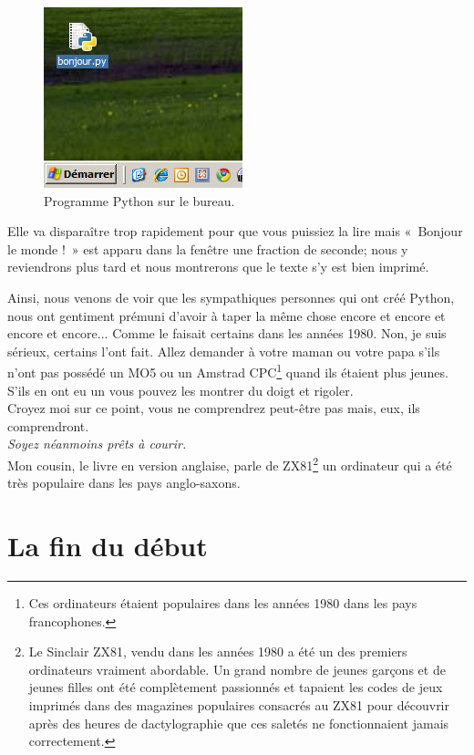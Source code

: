 \begin{figure}[!ht]
\centering
\includegraphics[scale=0.6]{images/bureau}
\caption{Programme Python sur le bureau.}\label{fig:bureau}
\end{figure}

Elle va disparaître trop rapidement pour que vous puissiez la lire mais « Bonjour le monde ! » est apparu dans la fenêtre une fraction de seconde; nous y reviendrons plus tard et nous montrerons que le texte s'y est bien imprimé.

Ainsi, nous venons de voir que les sympathiques personnes qui ont créé Python, nous ont gentiment prémuni d'avoir à taper la même chose encore et encore et encore et encore... Comme le faisait certains dans les années 1980. Non, je suis sérieux, certains l'ont fait. Allez demander à votre maman ou votre papa s'ils n'ont pas possédé un MO5 ou un Amstrad CPC\footnote{Ces ordinateurs étaient populaires dans les années 1980 dans les pays francophones.} quand ils étaient plus jeunes. S'ils en ont eu un vous pouvez les montrer du doigt et rigoler.\\


Croyez moi sur ce point, vous ne comprendrez peut-être pas mais, eux, ils comprendront.\\

\emph{Soyez néanmoins prêts à courir.}\\


Mon cousin, le livre en version anglaise, parle de ZX81\footnote{Le Sinclair ZX81, vendu dans les années 1980 a été un des premiers ordinateurs vraiment abordable. Un grand nombre de jeunes garçons et de jeunes filles ont été complètement passionnés et tapaient les codes de jeux imprimés dans des magazines populaires consacrés au ZX81 pour découvrir après des heures de dactylographie que ces saletés ne fonctionnaient jamais correctement.} un ordinateur qui a été très populaire dans les pays anglo-saxons.


\section*{La fin du début}

